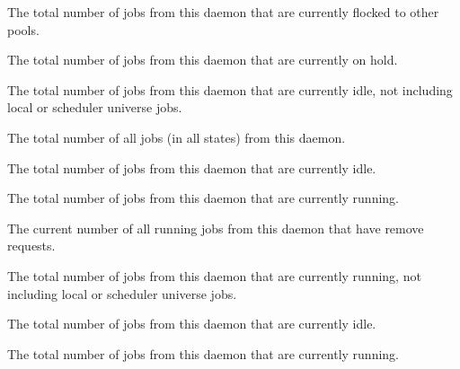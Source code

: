 \begin{description}
\item[\AdAttr{TotalFlockedJobs}:] The total number of jobs from this
   daemon that are currently flocked to other pools.

\item[\AdAttr{TotalHeldJobs}:] The total number of jobs from this
   daemon that are currently on hold.

\item[\AdAttr{TotalIdleJobs}:] The total number of jobs from this
   daemon that are currently idle, not including
  local or scheduler universe jobs.

\item[\AdAttr{TotalJobAds}:] The total number of all jobs (in all 
  states) from this  daemon.

\item[\AdAttr{TotalLocalIdleJobs}:] The total number of 
    jobs from this
   daemon that are currently idle.

\item[\AdAttr{TotalLocalRunningJobs}:] The total number of 
    jobs from this
   daemon that are currently running.

\item[\AdAttr{TotalRemovedJobs}:] The current number of all running jobs
  from this  daemon that have remove requests.

\item[\AdAttr{TotalRunningJobs}:] The total number of jobs from this
   daemon that are currently running, not including
  local or scheduler universe jobs.

\item[\AdAttr{TotalSchedulerIdleJobs}:] The total number of 
    jobs from this
   daemon that are currently idle.

\item[\AdAttr{TotalSchedulerRunningJobs}:] The total number of 
    jobs from this
   daemon that are currently running.


\end{description}
